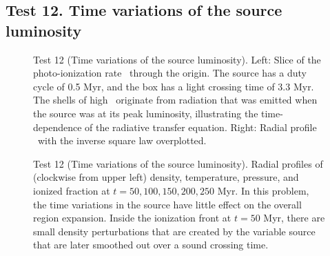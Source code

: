 \documentclass[apj,onecolumn]{emulateapj}
\begin{document}

\subsection{Test 12. Time variations of the source luminosity}

\begin{figure}[t]
  \caption{\label{fig:test12_kph} Test 12 (Time variations of the
    source luminosity).  Left: Slice of the photo-ionization rate
    \kph~through the origin.  The source has a duty cycle of 0.5 Myr,
    and the box has a light crossing time of 3.3 Myr.  The shells of
    high \kph~originate from radiation that was emitted when the
    source was at its peak luminosity, illustrating the
    time-dependence of the radiative transfer equation.  Right: Radial
    profile \kph~with the inverse square law overplotted.}
\end{figure}

\begin{figure}[t]
  \caption{\label{fig:test12_profiles} Test 12 (Time variations of the
    source luminosity).  Radial profiles of (clockwise from upper
    left) density, temperature, pressure, and ionized fraction at $t =
    50, 100, 150, 200, 250$ Myr.  In this problem, the time variations
    in the source have little effect on the overall  region
    expansion.  Inside the ionization front at $t = 50$ Myr, there are
    small density perturbations that are created by the variable
    source that are later smoothed out over a sound crossing time.}
\end{figure}
\end{document}
